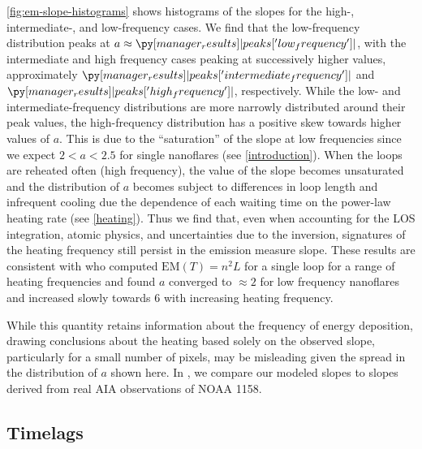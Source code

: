 \autoref{fig:em-slope-histograms} shows histograms of the \dem{} slopes for the high-, intermediate-, and low-frequency cases. We find that the low-frequency distribution peaks at $a\approx\py[manager_results]|peaks['low_frequency']|$, with the intermediate and high frequency cases peaking at successively higher values, approximately $\py[manager_results]|peaks['intermediate_frequency']|$ and $\py[manager_results]|peaks['high_frequency']|$, respectively. While the low- and intermediate-frequency distributions are more narrowly distributed around their peak values, the high-frequency distribution has a positive skew towards higher values of $a$. This is due to the ``saturation'' of the slope at low frequencies since we expect $2<a<2.5$ for single nanoflares (see \autoref{introduction}). When the loops are reheated often (high frequency), the value of the slope becomes unsaturated and the distribution of $a$ becomes subject to differences in loop length and infrequent cooling due the dependence of each waiting time on the power-law heating rate (see \autoref{heating}). Thus we find that, even when accounting for the LOS integration, atomic physics, and uncertainties due to the \dem{} inversion, signatures of the heating frequency still persist in the emission measure slope. These results are consistent with \citet{cargill_active_2014} who computed $\mathrm{EM}(T)=n^2L$ for a single loop for a range of heating frequencies and found $a$ converged to $\approx2$ for low frequency nanoflares and increased slowly towards 6 with increasing heating frequency. 

While this quantity retains information about the frequency of energy deposition, drawing conclusions about the heating based solely on the observed \dem{} slope, particularly for a small number of pixels, may be misleading given the spread in the distribution of $a$ shown here. In , we compare our modeled \dem{} slopes to slopes derived from real AIA observations of NOAA 1158.

\subsection{Timelags}\label{timelags}

